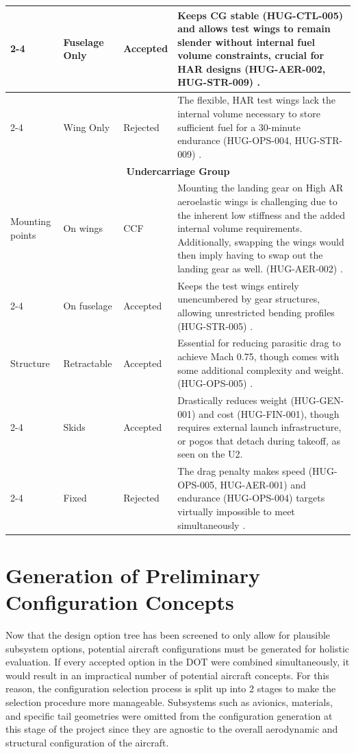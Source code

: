 \begin{longtable}{|p{1.6cm}|p{2.3cm}|p{1.6cm}|p{9.5cm}|}
\cline{2-4}
\multicolumn{1}{|l|}{} & Fuselage Only & Accepted & Keeps CG stable (HUG-CTL-005) and allows test wings to remain slender without internal fuel volume constraints, crucial for HAR designs (HUG-AER-002, HUG-STR-009) \cite{Ma2024}. \\
\cline{2-4}
\multicolumn{1}{|l|}{} & Wing Only & Rejected & The flexible, HAR test wings lack the internal volume necessary to store sufficient fuel for a 30-minute endurance (HUG-OPS-004, HUG-STR-009) \cite{Ma2024}. \\
\hline

\multicolumn{4}{|c|}{\textbf{Undercarriage Group}} \\
\hline
Mounting points & On wings & CCF &  Mounting the landing gear on High AR aeroelastic wings is challenging due to the inherent low stiffness and the added internal volume requirements. Additionally, swapping the wings would then imply having to swap out the landing gear as well. (HUG-AER-002) \cite{raymer1992aircraft}. \\
\cline{2-4}
\multicolumn{1}{|l|}{} & On fuselage & Accepted & Keeps the test wings entirely unencumbered by gear structures, allowing unrestricted bending profiles (HUG-STR-005) \cite{Vos}. \\
\hline
Structure & Retractable & Accepted & Essential for reducing parasitic drag to achieve Mach 0.75, though comes with some additional complexity and weight. (HUG-OPS-005) \cite{raymer1992aircraft}. \\
\cline{2-4}
\multicolumn{1}{|l|}{} & Skids & Accepted & Drastically reduces weight (HUG-GEN-001) and cost (HUG-FIN-001), though requires external launch infrastructure, or pogos that detach during takeoff, as seen on the U2. \cite{AirforceTechU2}\\
\cline{2-4}
\multicolumn{1}{|l|}{} & Fixed & Rejected & The drag penalty makes speed (HUG-OPS-005, HUG-AER-001) and endurance (HUG-OPS-004) targets virtually impossible to meet simultaneously \cite{raymer1992aircraft}. \\
\hline
\end{longtable}

\section{Generation of Preliminary Configuration Concepts}
\label{sec:prelim_config_concepts}

Now that the design option tree has been screened to only allow for plausible subsystem options, potential aircraft configurations must be generated for holistic evaluation. If every accepted option in the DOT were combined simultaneously, it would result in an impractical number of potential aircraft concepts. For this reason, the configuration selection process is split up into 2 stages to make the selection procedure more manageable. Subsystems such as avionics, materials, and specific tail geometries were omitted from the configuration generation at this stage of the project since they are agnostic to the overall aerodynamic and structural configuration of the aircraft.

